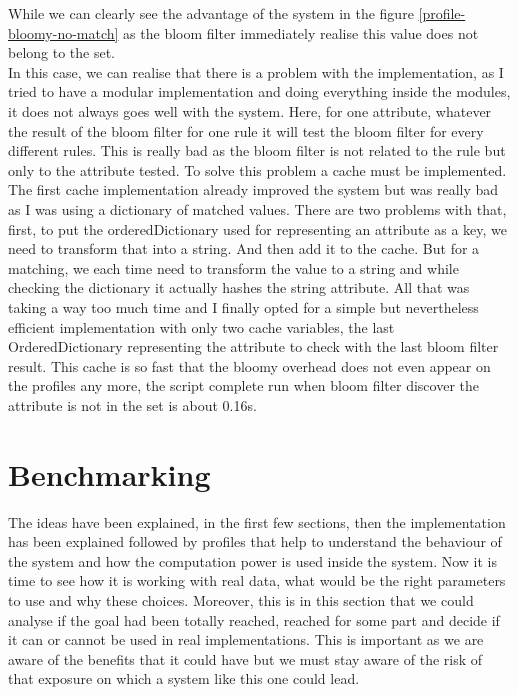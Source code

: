 \documentclass{eplmastersthesis}
\begin{document}
While we can clearly see the advantage of the system in the figure \ref{profile-bloomy-no-match} as the bloom filter immediately realise this value does not belong to the set.\\

In this case, we can realise that there is a problem with the implementation, as I tried to have a modular implementation and doing everything inside the modules, it does not always goes well with the system. Here, for one attribute, whatever the result of the bloom filter for one rule it will test the bloom filter for every different rules. This is really bad as the bloom filter is not related to the rule but only to the attribute tested. To solve this problem a cache must be implemented. The first cache implementation already improved the system but was really bad as I was using a dictionary of matched values.
There are two problems with that, first, to put the orderedDictionary used for representing an attribute as a key, we need to transform that into a string. And then add it to the cache.
But for a matching, we each time need to transform the value to a string and while checking the dictionary it actually hashes the string attribute. All that was taking a way too much time and I finally opted for a simple but nevertheless efficient implementation with only two cache variables, the last OrderedDictionary representing the attribute to check with the last bloom filter result.
This cache is so fast that the bloomy overhead does not even appear on the profiles any more, the script complete run when bloom filter discover the attribute is not in the set is about 0.16s.\\

\section{Benchmarking}
The ideas have been explained, in the first few sections, then the implementation has been explained followed by profiles that help to understand the behaviour of the system and how the computation power is used inside the system. Now it is time to see how it is working with real data, what would be the right parameters to use and why these choices. Moreover, this is in this section that we could analyse if the goal had been totally reached, reached for some part and decide if it can or cannot be used in real implementations.
This is important as we are aware of the benefits that it could have but we must stay aware of the risk of that exposure on which a system like this one could lead.\\
\end{document}
